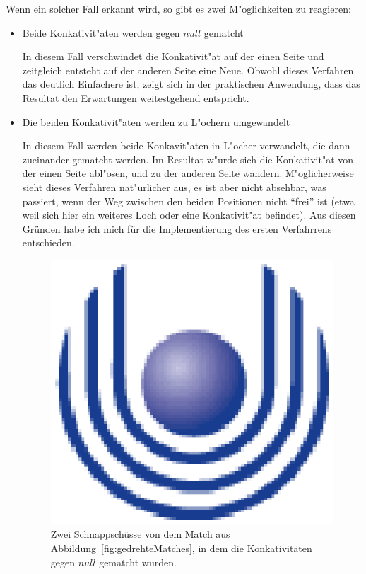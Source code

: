 Wenn ein solcher Fall erkannt wird, so gibt es zwei M"oglichkeiten zu reagieren:
\begin{itemize}
\item Beide Konkativit"aten werden gegen $null$ gematcht

In diesem Fall verschwindet die Konkativit"at auf der einen Seite  und zeitgleich entsteht auf der anderen Seite eine Neue. Obwohl dieses Verfahren das deutlich Einfachere ist, zeigt sich in der praktischen Anwendung, dass das Resultat den Erwartungen weitestgehend entspricht.

\item Die beiden Konkativit"aten werden zu L"ochern umgewandelt

In diesem Fall werden beide Konkavit"aten in L"ocher verwandelt, die dann zueinander gematcht werden. Im Resultat w"urde sich die Konkativit"at von der einen Seite abl"osen, und zu der anderen Seite wandern. M"oglicherweise sieht dieses Verfahren nat"urlicher aus, es ist aber nicht absehbar, was passiert, wenn der Weg zwischen den beiden Positionen nicht "`frei"' ist (etwa weil sich hier ein weiteres Loch oder eine Konkativit"at befindet). Aus diesen Gründen habe ich mich für die Implementierung des ersten Verfahrrens entschieden.
\begin{figure}
	\centering
	\includegraphics{feu_logo2.eps}
	\caption[Schnappschüsse von den gedrehten Polygonen]{Zwei Schnappschüsse von dem Match aus Abbildung~\ref{fig:gedrehteMatches}, in dem die Konkativitäten gegen $null$ gematcht wurden.}
	\label{fig:gedrehteMatches2}
\end{figure}

\end{itemize}


